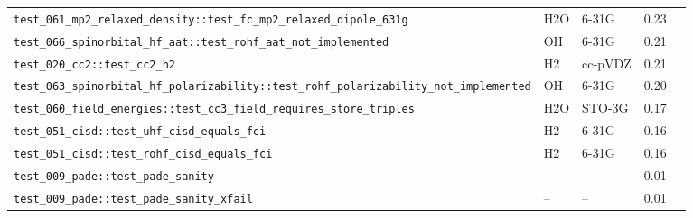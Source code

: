 \documentclass[10pt]{article}
\begin{document}
\begin{longtable}{l l l r c}
\texttt{test\_061\_mp2\_relaxed\_density::test\_fc\_mp2\_relaxed\_dipole\_631g} & H2O & 6-31G & 0.23 &  \\
\texttt{test\_066\_spinorbital\_hf\_aat::test\_rohf\_aat\_not\_implemented} & OH & 6-31G & 0.21 &  \\
\texttt{test\_020\_cc2::test\_cc2\_h2} & H2 & cc-pVDZ & 0.21 &  \\
\texttt{test\_063\_spinorbital\_hf\_polarizability::test\_rohf\_polarizability\_not\_implemented} & OH & 6-31G & 0.20 &  \\
\texttt{test\_060\_field\_energies::test\_cc3\_field\_requires\_store\_triples} & H2O & STO-3G & 0.17 &  \\
\texttt{test\_051\_cisd::test\_uhf\_cisd\_equals\_fci} & H2 & 6-31G & 0.16 &  \\
\texttt{test\_051\_cisd::test\_rohf\_cisd\_equals\_fci} & H2 & 6-31G & 0.16 &  \\
\texttt{test\_009\_pade::test\_pade\_sanity} & -- & -- & 0.01 &  \\
\texttt{test\_009\_pade::test\_pade\_sanity\_xfail} & -- & -- & 0.01 &  \\
\end{longtable}
\end{document}
